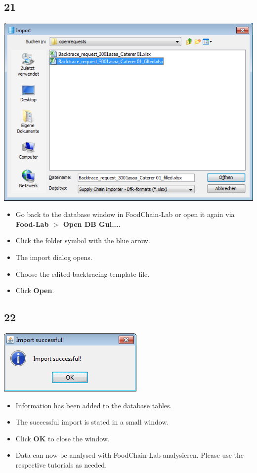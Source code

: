 \documentclass{beamer}
\begin{document}
\subsection{21}
\begin{frame}
	\begin{center}
  		\includegraphics[height=0.6\textheight]{21.png}
	\end{center}
	\begin{itemize}
		\item Go back to the database window in FoodChain-Lab or open it again via \textbf{Food-Lab $>$ Open DB Gui...}.
		\item Click the folder symbol with the blue arrow.
		\item The import dialog opens.
		\item Choose the edited backtracing template file.
		\item Click \textbf{Open}.
	\end{itemize}
\end{frame}

\subsection{22}
\begin{frame}
	\begin{center}
  		\includegraphics[height=0.3\textheight]{22.png}
	\end{center}
	\begin{itemize}
		\item Information has been added to the database tables.
		\item The successful import is stated in a small window.
		\item Click \textbf{OK} to close the window.
		\item Data can now be analysed with FoodChain-Lab analysieren. Please use the respective tutorials as needed.
	\end{itemize}
\end{frame}
\end{document}

